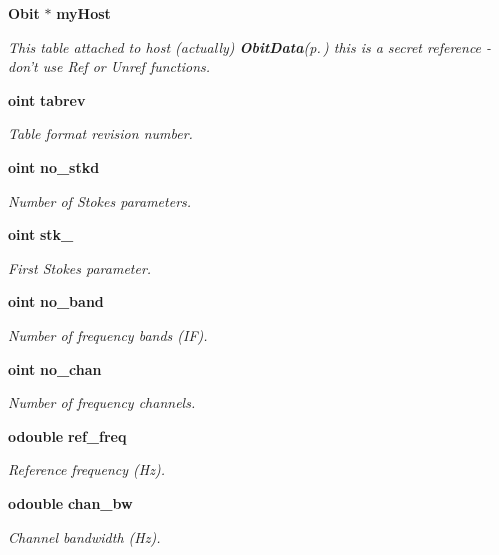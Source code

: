 \begin{CompactItemize}
{\bf Obit} $\ast$ {\bf my\-Host}
\begin{CompactList}\small\item\em This table attached to host (actually) {\bf Obit\-Data}{\rm (p.\,\pageref{structObitData})} this is a secret reference - don't use Ref or Unref functions. \item\end{CompactList}\item 
{\bf oint} {\bf tabrev}
\begin{CompactList}\small\item\em Table format revision number. \item\end{CompactList}\item 
{\bf oint} {\bf no\_\-stkd}
\begin{CompactList}\small\item\em Number of Stokes parameters. \item\end{CompactList}\item 
{\bf oint} {\bf stk\_}
\begin{CompactList}\small\item\em First Stokes parameter. \item\end{CompactList}\item 
{\bf oint} {\bf no\_\-band}
\begin{CompactList}\small\item\em Number of frequency bands (IF). \item\end{CompactList}\item 
{\bf oint} {\bf no\_\-chan}
\begin{CompactList}\small\item\em Number of frequency channels. \item\end{CompactList}\item 
{\bf odouble} {\bf ref\_\-freq}
\begin{CompactList}\small\item\em Reference frequency (Hz). \item\end{CompactList}\item 
{\bf odouble} {\bf chan\_\-bw}
\begin{CompactList}\small\item\em Channel bandwidth (Hz). \item\end{CompactList}\item 

\end{CompactItemize}
